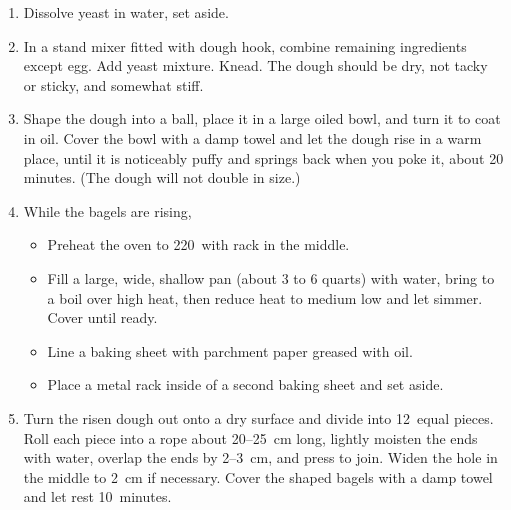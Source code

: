 
\begin{ingredients}
\end{ingredients}


\begin{recipe}
  \begin{enumerate}

  \item Dissolve yeast in water, set aside.

  \item In a stand mixer fitted with dough hook, combine remaining
    ingredients except egg.  Add yeast mixture.  Knead.  The dough
    should be dry, not tacky or sticky, and somewhat stiff.

  \item Shape the dough into a ball, place it in a large oiled bowl,
    and turn it to coat in oil. Cover the bowl with a damp towel and
    let the dough rise in a warm place, until it is noticeably puffy
    and springs back when you poke it, about 20 minutes. (The dough
    will not double in size.)

  \item While the bagels are rising,
    \begin{itemize}
      
    \item Preheat the oven to 220\degreeC\ with rack in the middle.

    \item Fill a large, wide, shallow pan (about 3 to 6 quarts) with
      water, bring to a boil over high heat, then reduce heat to
      medium low and let simmer. Cover until ready.

    \item Line a baking sheet with parchment paper greased with
      oil.

    \item Place a metal rack inside of a second baking sheet and set
      aside.

    \end{itemize}

  \item Turn the risen dough out onto a dry surface and divide into
    12~equal pieces.  Roll each piece into a rope about 20--25~cm
    long, lightly moisten the ends with water, overlap the ends by
    2--3~cm, and press to join. Widen the hole in the middle to 2~cm
    if necessary.  Cover the shaped bagels with a damp towel and let
    rest 10~minutes.


\end{enumerate}
\end{recipe}

